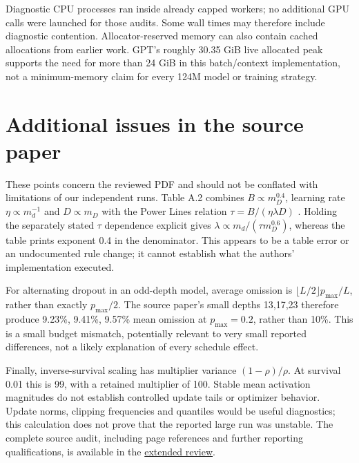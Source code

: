 \documentclass[10pt,letterpaper]{article}
\begin{document}
Diagnostic CPU processes ran inside already capped workers; no additional GPU calls were launched for those audits. Some wall times may therefore include diagnostic contention. Allocator-reserved memory can also contain cached allocations from earlier work. GPT's roughly 30.35 GiB live allocated peak supports the need for more than 24 GiB in this batch/context implementation, not a minimum-memory claim for every 124M model or training strategy.

\section{Additional issues in the source paper}
These points concern the reviewed PDF and should not be conflated with limitations of our independent runs. Table A.2 combines $B\propto m_D^{0.4}$, learning rate $\eta\propto m_d^{-1}$ and $D\propto m_D$ with the Power Lines relation $\tau=B/(\eta\lambda D)$ \citep{powerlines}. Holding the separately stated $\tau$ dependence explicit gives $\lambda\propto m_d/(\tau m_D^{0.6})$, whereas the table prints exponent 0.4 in the denominator. This appears to be a table error or an undocumented rule change; it cannot establish what the authors' implementation executed.

For alternating dropout in an odd-depth model, average omission is $\lfloor L/2\rfloor p_{\max}/L$, rather than exactly $p_{\max}/2$. The source paper's small depths 13,17,23 therefore produce 9.23\%, 9.41\%, 9.57\% mean omission at $p_{\max}=0.2$, rather than 10\%. This is a small budget mismatch, potentially relevant to very small reported differences, not a likely explanation of every schedule effect.

Finally, inverse-survival scaling has multiplier variance $(1-\rho)/\rho$. At survival 0.01 this is 99, with a retained multiplier of 100. Stable mean activation magnitudes do not establish controlled update tails or optimizer behavior. Update norms, clipping frequencies and quantiles would be useful diagnostics; this calculation does not prove that the reported large run was unstable. The complete source audit, including page references and further reporting qualifications, is available in the \href{https://yaroslavvb.github.io/gradient-dissent/review.html}{extended review}.
\end{document}
